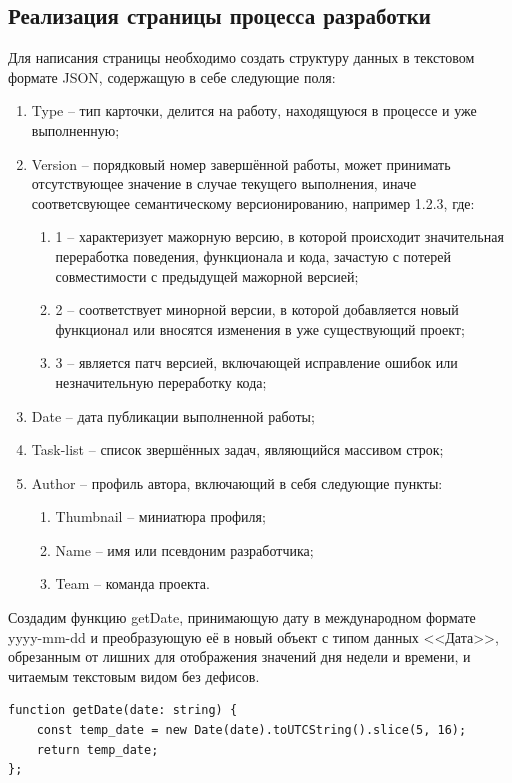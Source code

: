\documentclass[master, och, diploma]{SCWorks}
\begin{document}
\subsection{Реализация страницы процесса разработки}
Для написания страницы необходимо создать структуру данных в текстовом формате JSON, содержащую в себе следующие поля:
\begin{enumerate}
    \item Type -- тип карточки, делится на работу, находящуюся в процессе и уже выполненную;
    \item Version -- порядковый номер завершённой работы, может принимать отсутствующее значение в случае текущего выполнения, иначе соответсвующее семантическому версионированию, например 1.2.3, где:
    \begin{enumerate}
        \item 1 -- характеризует мажорную версию, в которой происходит значительная переработка поведения, функционала и кода, зачастую с потерей совместимости с предыдущей мажорной версией;
        \item 2 -- соответствует минорной версии, в которой добавляется новый функционал или вносятся изменения в уже существующий проект;
        \item 3 -- является патч версией, включающей исправление ошибок или незначительную переработку кода;
    \end{enumerate} 
    \item Date -- дата публикации выполненной работы;
    \item Task-list -- список звершённых задач, являющийся массивом строк;
    \item Author -- профиль автора, включающий в себя следующие пункты:
    \begin{enumerate}
        \item Thumbnail -- миниатюра профиля;
        \item Name -- имя или псевдоним разработчика;
        \item Team -- команда проекта.
    \end{enumerate} 
\end{enumerate}

Создадим функцию getDate, принимающую дату в международном формате yyyy-mm-dd и преобразующую её в новый объект с типом данных <<Дата>>, обрезанным от лишних для отображения значений дня недели и времени, и читаемым текстовым видом без дефисов.
\begin{verbatim}
function getDate(date: string) {
    const temp_date = new Date(date).toUTCString().slice(5, 16);
    return temp_date;
};
\end{verbatim}
\end{document}
